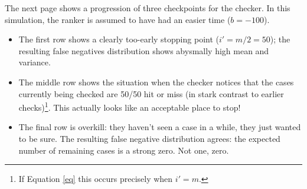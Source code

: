 \documentclass{article}
\begin{document}
The next page shows a progression of three checkpoints for the checker. In this simulation, the ranker is assumed to have had an easier time ($b=-100$).
\begin{itemize}
\item The first row shows a clearly too-early stopping point ($i'=m/2=50$); the resulting false negatives distribution shows abysmally high mean and variance.
\item The middle row shows the situation when the checker notices that the cases currently being checked are 50/50 hit or miss (in stark contrast to earlier checks)\footnote{If Equation \ref{eq} this occurs precisely when $i'=m$.}. This actually looks like an acceptable place to stop!
\item The final row is overkill: they haven't seen a case in a while, they just wanted to be sure. The resulting false negative distribution agrees: the expected number of remaining cases is a strong zero. Not one, zero.
\end{itemize}
\newpage
\end{document}

